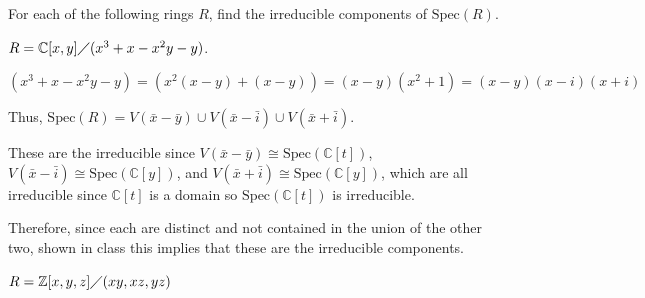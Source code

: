 \documentclass[12pt, letterpaper]{article}
\newcommand{\C}{\mathbb{C}}
\newcommand{\Z}{\mathbb{Z}}
\newcommand{\Spec}{\mathrm{Spec}}
\begin{document}
\begin{problem}{}
    For each of the following rings $R$, find the irreducible components of $\Spec(R)$.
\end{problem}
\begin{subproblem}{}
    $R=\C[x,y] \diagup (x^3+x-x^2y-y)$.
\end{subproblem}
\begin{problemproof}
    $(x^3+x-x^2y-y)=(x^2(x-y)+(x-y))=(x-y)(x^2+1)=(x-y)(x-i)(x+i)$

    Thus, $\Spec(R)=V(\bar{x}-\bar{y}) \cup V(\bar{x}-\bar{i}) \cup V(\bar{x}+\bar{i})$.

    These are the irreducible since $V(\bar{x}-\bar{y}) \cong \Spec(\C[t])$, $V(\bar{x}-\bar{i}) \cong \Spec(\C[y])$, and $V(\bar{x}+\bar{i}) \cong \Spec(\C[y])$,
    which are all irreducible since $\C[t]$ is a domain so $\Spec(\C[t])$ is irreducible.

    Therefore, since each are distinct and not contained in the union of the other two, shown in class this implies that these are the irreducible components.
\end{problemproof}
\begin{subproblem}{}
    $R=\Z[x,y,z] \diagup (xy,xz,yz)$
\end{subproblem}
\end{document}
